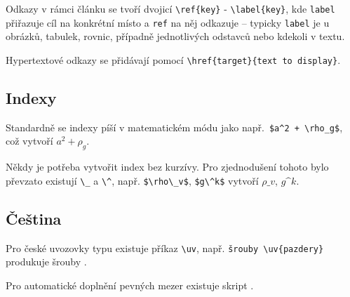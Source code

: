 \documentclass{cygclanek}
\begin{document}
Odkazy v rámci článku se tvoří dvojicí \verb|\ref{key}| - \verb|\label{key}|, kde \verb|label| přiřazuje 
cíl na konkrétní místo a \verb|ref| na něj odkazuje -- typicky \verb|label| je u obrázků, tabulek, rovnic, 
případně jednotlivých odstavců nebo kdekoli v textu.  

Hypertextové odkazy se přidávají pomocí \verb|\href{target}{text to display}|.

\subsection{Indexy}
Standardně se indexy píší v matematickém módu jako např.~\verb|$a^2 + \rho_g$|, což vytvoří $a^2 + \rho_g$. 

Někdy je potřeba vytvořit index bez kurzívy. Pro zjednodušení tohoto bylo převzato existují \verb|\_| 
a \verb|\^|, např. \verb|$\rho\_v$|, \verb|$g\^k$| vytvoří $\rho\_v$, $g\^k$. 


\subsection{Čeština}
Pro české uvozovky typu  existuje příkaz \verb|\uv|, např. \verb|šrouby \uv{pazdery}| produkuje 
šrouby .

Pro automatické doplnění pevných mezer existuje skript  \cite{vlna}.


\printbibliography[title={Literatura}]
\end{document}
